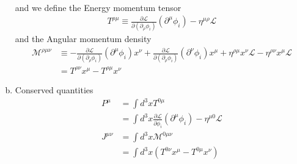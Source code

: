 \documentclass[10pt,a4paper]{report}
\theoremstyle{definition}
\begin{document}
\begin{enumerate}[a)]
\begin{align}
\end{align}
and we define the Energy momentum tensor
\begin{align}
T^{\rho\mu}\equiv\frac{\partial\mathcal{L}}{\partial(\partial_\rho\phi_i)}(\partial^\mu\phi_i)-\eta^{\mu\rho}\mathcal{L}
\end{align}
and the Angular momentum density
\begin{align}
\mathcal{M}^{\rho\mu\nu}
&\equiv
-\frac{\partial\mathcal{L}}{\partial(\partial_\rho\phi_i)}(\partial^\mu\phi_i) x^\nu
+\frac{\partial\mathcal{L}}{\partial(\partial_\rho\phi_i)}(\partial^\nu\phi_i) x^\mu
+\eta^{\rho\mu} x^\nu\mathcal{L}
-\eta^{\rho\nu} x^\mu\mathcal{L}\\
&=T^{\rho\nu}x^\mu-T^{\rho\mu}x^\nu
\end{align}

\item Conserved quantities
\begin{align}
P^\mu
&=\int d^3 x T^{0\mu}\\
&=\int d^3 x \frac{\partial\mathcal{L}}{\partial\dot{\phi}_i}(\partial^\mu\phi_i)-\eta^{\mu0}\mathcal{L}\\
J^{\mu\nu}&=\int d^3 x \mathcal{M}^{0\mu\nu}\\
&=\int d^3 x (T^{0\nu}x^\mu-T^{0\mu}x^\nu)
\end{align}

\end{enumerate}
\end{document}
